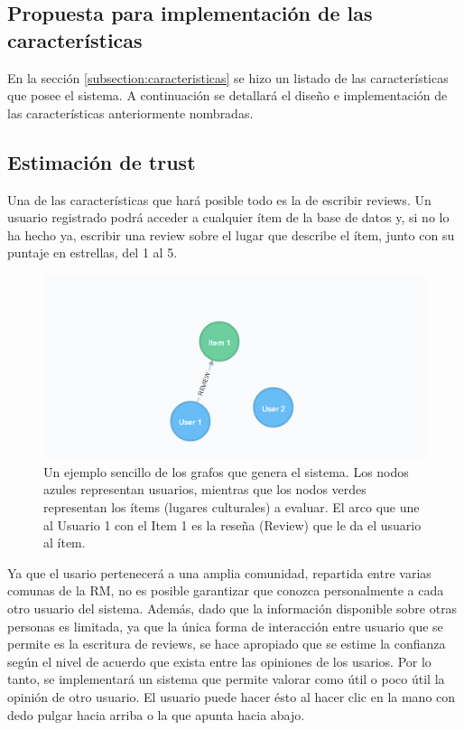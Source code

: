 \subsection{Propuesta para implementación de las características}

En la sección \ref{subsection:caracteristicas} se hizo un listado de las características que posee el sistema. A continuación se detallará el diseño e implementación de las características anteriormente nombradas.

\subsection{Estimación de trust} 

Una de las características que hará posible todo es la de escribir reviews. Un usuario registrado podrá acceder a cualquier ítem de la base de datos y, si no lo ha hecho ya, escribir una review sobre el lugar que describe el ítem, junto con su puntaje en estrellas, del 1 al 5.

\begin{figure}[hbtp]
\centering
\includegraphics[scale=0.9]{images/grafoej1.png}
\caption{Un ejemplo sencillo de los grafos que genera el sistema. Los nodos azules representan usuarios, mientras que los nodos verdes representan los ítems (lugares culturales) a evaluar. El arco que une al Usuario 1 con el Item 1 es la reseña (Review) que le da el usuario al ítem.}
\end{figure}

Ya que el usario pertenecerá a una amplia comunidad, repartida entre varias comunas de la RM, no es posible garantizar que conozca personalmente a cada otro usuario del sistema. Además, dado que la información disponible sobre otras personas es limitada, ya que la única forma de interacción entre usuario que se permite es la escritura de reviews, se hace apropiado que se estime la confianza según el nivel de acuerdo que exista entre las opiniones de los usarios. Por lo tanto, se implementará un sistema que permite valorar como útil o poco útil la opinión de otro usuario. El usuario puede hacer ésto al hacer clic en la mano con dedo pulgar hacia arriba o la que apunta hacia abajo.

